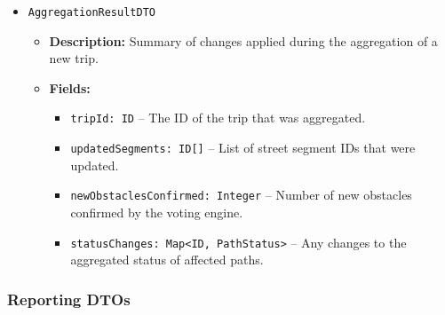 \begin{itemize}
    \item \texttt{AggregationResultDTO}
    \begin{itemize}
        \item \textbf{Description:} Summary of changes applied during the aggregation of a new trip.
        \item \textbf{Fields:}
        \begin{itemize}
            \item \texttt{tripId: ID} – The ID of the trip that was aggregated.
            \item \texttt{updatedSegments: ID[]} – List of street segment IDs that were updated.
            \item \texttt{newObstaclesConfirmed: Integer} – Number of new obstacles confirmed by the voting engine.
            \item \texttt{statusChanges: Map<ID, PathStatus>} – Any changes to the aggregated status of affected paths.
        \end{itemize}
    \end{itemize}
\end{itemize}

\subsubsection{Reporting DTOs}

